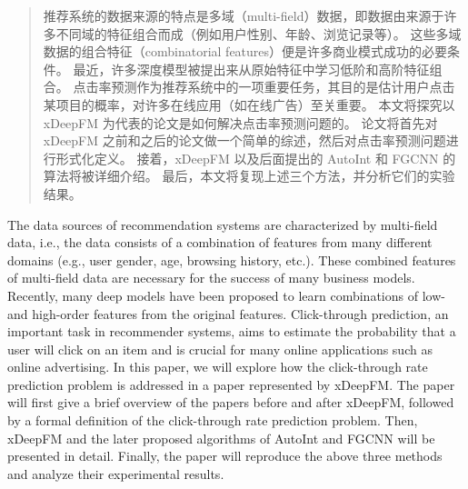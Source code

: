 \documentclass[degree=master,cjk-font=noto]{thuthesis}
\begin{document}
\maketitle

\frontmatter
\begin{abstract}
  推荐系统的数据来源的特点是多域（multi-field）数据，即数据由来源于许多不同域的特征组合而成（例如用户性别、年龄、浏览记录等）。
  这些多域数据的组合特征（combinatorial features）便是许多商业模式成功的必要条件。
  最近，许多深度模型被提出来从原始特征中学习低阶和高阶特征组合。
  点击率预测作为推荐系统中的一项重要任务，其目的是估计用户点击某项目的概率，对许多在线应用（如在线广告）至关重要。
  本文将探究以 xDeepFM 为代表的论文是如何解决点击率预测问题的。
  论文将首先对 xDeepFM 之前和之后的论文做一个简单的综述，然后对点击率预测问题进行形式化定义。
  接着，xDeepFM 以及后面提出的 AutoInt 和 FGCNN 的算法将被详细介绍。
  最后，本文将复现上述三个方法，并分析它们的实验结果。

\end{abstract}

\begin{abstract*}
  The data sources of recommendation systems are characterized by multi-field data, i.e., the data consists of a combination of features from many different domains (e.g., user gender, age, browsing history, etc.).
  These combined features of multi-field data are necessary for the success of many business models.
  Recently, many deep models have been proposed to learn combinations of low- and high-order features from the original features.
  Click-through prediction, an important task in recommender systems, aims to estimate the probability that a user will click on an item and is crucial for many online applications such as online advertising.
  In this paper, we will explore how the click-through rate prediction problem is addressed in a paper represented by xDeepFM.
  The paper will first give a brief overview of the papers before and after xDeepFM, followed by a formal definition of the click-through rate prediction problem.
  Then, xDeepFM and the later proposed algorithms of AutoInt and FGCNN will be presented in detail.
  Finally, the paper will reproduce the above three methods and analyze their experimental results.

\end{abstract*}
\end{document}
